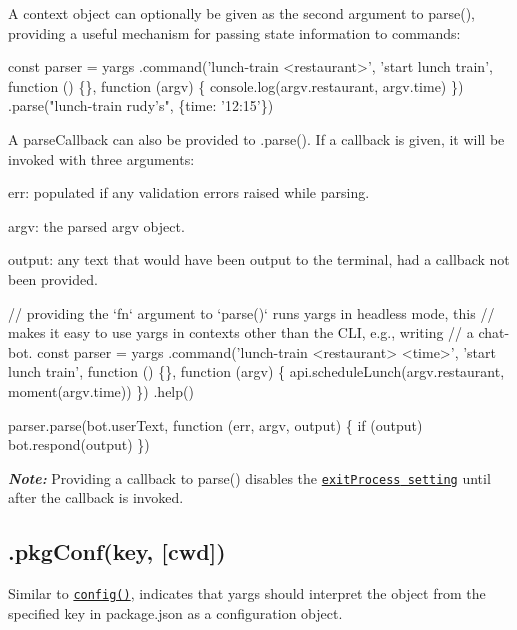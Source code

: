 A {\ttfamily context} object can optionally be given as the second argument to {\ttfamily parse()}, providing a useful mechanism for passing state information to commands\+:


\begin{DoxyCode}
const parser = yargs
  .command('lunch-train <restaurant>', 'start lunch train', function () \{\}, function (argv) \{
    console.log(argv.restaurant, argv.time)
  \})
  .parse("lunch-train rudy's", \{time: '12:15'\})
\end{DoxyCode}


A {\ttfamily parse\+Callback} can also be provided to {\ttfamily .parse()}. If a callback is given, it will be invoked with three arguments\+:


\begin{DoxyEnumerate}
\item {\ttfamily err}\+: populated if any validation errors raised while parsing.
\item {\ttfamily argv}\+: the parsed argv object.
\item {\ttfamily output}\+: any text that would have been output to the terminal, had a callback not been provided.
\end{DoxyEnumerate}


\begin{DoxyCode}
// providing the `fn` argument to `parse()` runs yargs in headless mode, this
// makes it easy to use yargs in contexts other than the CLI, e.g., writing
// a chat-bot.
const parser = yargs
  .command('lunch-train <restaurant> <time>', 'start lunch train', function () \{\}, function (argv) \{
    api.scheduleLunch(argv.restaurant, moment(argv.time))
  \})
  .help()

parser.parse(bot.userText, function (err, argv, output) \{
  if (output) bot.respond(output)
\})
\end{DoxyCode}


{\itshape {\bfseries Note\+:}} Providing a callback to {\ttfamily parse()} disables the \href{#exitprocess}{\tt {\ttfamily exit\+Process} setting} until after the callback is invoked.

\subsection*{.pkg\+Conf(key, \mbox{[}cwd\mbox{]}) }

Similar to \href{#config}{\tt {\ttfamily config()}}, indicates that yargs should interpret the object from the specified key in package.\+json as a configuration object.

